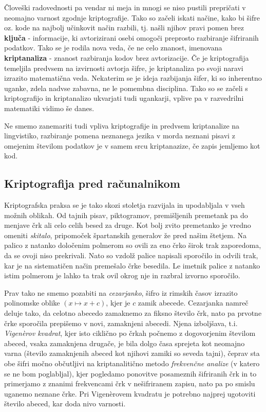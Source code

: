 \documentclass[a4paper, 12pt]{article} %
\begin{document}
\newline
\newline
Človeški radovednosti pa vendar ni meja in mnogi se niso pustili prepričati v neomajno varnost zgodnje kriptografije. Tako so začeli iskati načine, kako bi šifre oz. kode na najbolj učinkovit način razbili, tj. našli njihov pravi pomen brez \textbf{ključa} - informacije, ki avtorizirani osebi omogoči preprosto razbiranje šifriranih podatkov. Tako se je rodila nova veda, če ne celo znanost, imenovana \textbf{kriptanaliza} - znanost razbiranja kodov brez avtorizacije. Če je kriptografija temeljila predvsem na izvirnosti avtorja šifre, je kriptanaliza po svoji naravi izrazito matematična veda. Nekaterim se je ideja razbijanja šifer, ki so inherentno uganke, zdela nadvse zabavna, ne le pomembna disciplina. Tako so se začeli s kriptografijo in kriptanalizo ukvarjati tudi ugankarji, vplive pa v razvedrilni matematiki vidimo še danes.

Ne smemo zanemariti tudi vpliva kriptografije in predvsem kriptanalize na lingvistiko, razbiranje pomena neznanega jezika v morda neznani pisavi z omejenim številom podatkov je v samem srcu kriptanazize, če zapis jemljemo kot kod.

\subsection{Kriptografija pred računalnikom}

Kriptografska praksa se je tako skozi stoletja razvijala in upodabljala v vseh možnih oblikah. Od tajnih pisav, piktogramov, premišljenih premetank pa do menjave črk ali celo celih besed za druge. Kot bolj zvito premetanko je vredno omeniti \emph{skitalo}, pripomoček špartanskih generalov že pred našim štetjem. Na palico z natanko določenim polmerom so ovili za eno črko širok trak zaporedoma, da se ovoji niso prekrivali. Nato so vzdolž palice napisali sporočilo in odvili trak, kar je na sistematičen način premešalo črke besedila. Le imetnik palice z natanko istim polmerom je lahko ta trak ovil okrog nje in razbral izvorno sporočilo.

Prav tako ne smemo pozabiti na \emph{cezarjanko}, šifro iz rimskih časov izrazito polinomske oblike $(x \mapsto x + c)$, kjer je $c$ zamik abecede. Cezarjanka namreč deluje tako, da celotno abecedo zamaknemo za fiksno število črk, nato pa prvotne črke sporočila prepišemo v novi, zamaknjeni abecedi. Njena izboljšava, t.i. \emph{Vigen\`{e}rov kvadrat}, kjer isto ciklično po črkah počnemo z dogovorjenim številom abeced, vsaka zamaknjena drugače, je bila dolgo časa sprejeta kot neomajno varna (število zamaknjenih abeced kot njihovi zamiki so seveda tajni), čeprav sta obe šifri močno občutljivi na kriptanalitično metodo \emph{frekvenčne analize} (v katero se ne bom poglabljal), kjer pogledamo ponovitve posameznih šifriranih črk in to primerjamo z znanimi frekvencami črk v nešifriranem zapisu, nato pa po smislu uganemo neznane črke. Pri Vigen\`{e}rovem kvadratu je potrebno najprej ugotoviti število abeced, kar doda nivo varnosti.
\end{document}
